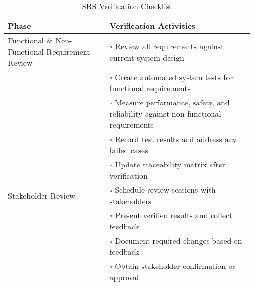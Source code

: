 \documentclass[12pt, titlepage]{article}
\begin{document}
\begin{table}[H]
  \centering
  \caption{SRS Verification Checklist}
  \label{tab:srs_verification_checklist}
  \renewcommand{\arraystretch}{1.3}
  \setlength{\tabcolsep}{8pt}
  \begin{tabular}{|p{4.4cm}|p{10.1cm}|}
    \hline
    \textbf{Phase}                                  & \textbf{Verification Activities}                                                              \\ \hline

    Functional \& Non-Functional Requirement Review & $\square$ \; Review all
    requirements against current system design                                                                                                      \\[-2pt]
                                                    & $\square$ \; Create automated system tests for functional requirements                        \\[-2pt]
                                                    & $\square$ \; Measure performance, safety, and reliability against non-functional requirements \\[-2pt]
                                                    & $\square$ \; Record test results and address any failed cases                                 \\[-2pt]
                                                    & $\square$ \; Update traceability matrix after verification                                    \\ \hline

    Stakeholder Review                              & $\square$ \; Schedule review sessions with stakeholders                                       \\[-2pt]
                                                    & $\square$ \; Present verified results and collect feedback                                    \\[-2pt]
                                                    & $\square$ \; Document required changes based on feedback                                      \\[-2pt]
                                                    & $\square$ \; Obtain stakeholder confirmation or approval                                      \\ \hline


\end{tabular}
\end{table}
\end{document}
